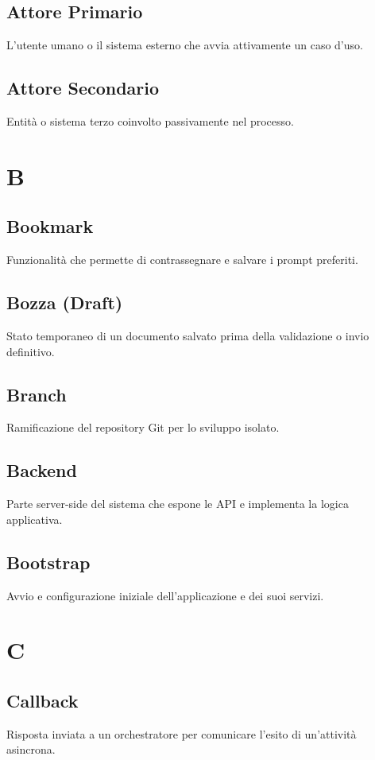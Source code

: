 \documentclass[a4paper,12pt]{article}
\begin{document}
\subsection{Attore Primario}
L'utente umano o il sistema esterno che avvia attivamente un caso d'uso.

\subsection{Attore Secondario}
Entità o sistema terzo coinvolto passivamente nel processo.

\section{B}
\subsection{Bookmark}
Funzionalità che permette di contrassegnare e salvare i prompt preferiti.

\subsection{Bozza (Draft)}
Stato temporaneo di un documento salvato prima della validazione o invio definitivo.

\subsection{Branch}
Ramificazione del repository Git per lo sviluppo isolato.

\subsection{Backend}
Parte server-side del sistema che espone le API e implementa la logica applicativa.

\subsection{Bootstrap}
Avvio e configurazione iniziale dell'applicazione e dei suoi servizi.


\section{C}

\subsection{Callback}
Risposta inviata a un orchestratore per comunicare l'esito di un'attività asincrona.
\end{document}

